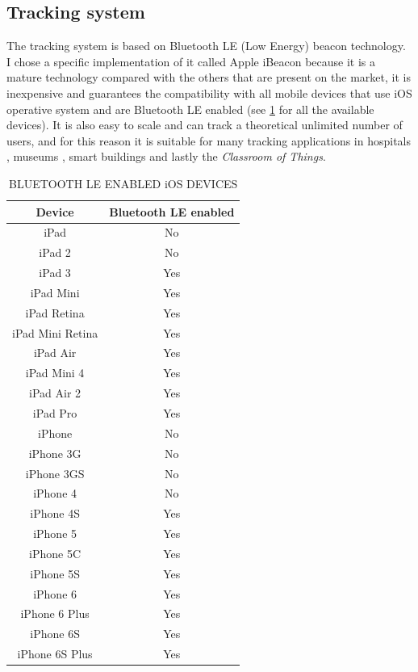\subsection{Tracking system}
The tracking system is based on Bluetooth LE (Low Energy) beacon technology. I chose a specific implementation of it called Apple iBeacon because it is a mature technology compared with the others that are present on the market, it is inexpensive and guarantees the compatibility with all mobile devices that use iOS operative system and are Bluetooth LE enabled (see \ref{tab:bluetooth_le_enabled} for all the available devices). It is also easy to scale and can track a theoretical unlimited number of users, and for this reason it is suitable for many tracking applications in hospitals \cite{yang:ibeacon}, museums \cite{he:proposal}, smart buildings \cite{corna:occupancy} and lastly the \textit{Classroom of Things}.

\begin{table}
\centering
\caption{BLUETOOTH LE ENABLED iOS DEVICES}
\begin{tabular}{ | c | c | }
\hline
Device & Bluetooth LE enabled \\
\hline
\hline
iPad             & No \\
iPad 2           & No \\
iPad 3           & Yes \\
iPad Mini        & Yes \\
iPad Retina      & Yes \\
iPad Mini Retina & Yes \\
iPad Air         & Yes \\
iPad Mini 4      & Yes \\
iPad Air 2       & Yes \\
iPad Pro         & Yes \\
iPhone           & No  \\
iPhone 3G        & No  \\
iPhone 3GS       & No  \\
iPhone 4         & No  \\
iPhone 4S        & Yes \\
iPhone 5         & Yes \\
iPhone 5C        & Yes \\
iPhone 5S        & Yes \\
iPhone 6         & Yes \\
iPhone 6 Plus    & Yes \\
iPhone 6S        & Yes \\
iPhone 6S Plus   & Yes \\

\hline
\end{tabular}
\label{tab:bluetooth_le_enabled}
\end{table}

